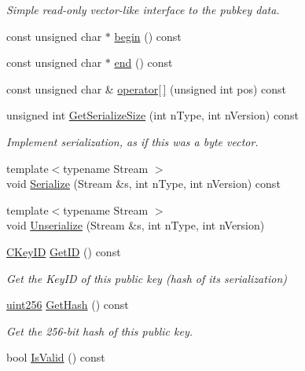 \begin{DoxyCompactItemize}
\begin{DoxyCompactList}\small\item\em Simple read-\/only vector-\/like interface to the pubkey data. \end{DoxyCompactList}\item 
const unsigned char $\ast$ \mbox{\hyperlink{class_c_pub_key_a859ab9909d68092d6d4fc739237ab358}{begin}} () const
\item 
const unsigned char $\ast$ \mbox{\hyperlink{class_c_pub_key_a1d6fb1ec2b45fb229f549215d6a23dbc}{end}} () const
\item 
const unsigned char \& \mbox{\hyperlink{class_c_pub_key_ab94321a511874f4a3cdf21f889d30144}{operator\mbox{[}$\,$\mbox{]}}} (unsigned int pos) const
\item 
unsigned int \mbox{\hyperlink{class_c_pub_key_aeb5fed8b8e3dea754e485147c1a1a8ed}{Get\+Serialize\+Size}} (int n\+Type, int n\+Version) const
\begin{DoxyCompactList}\small\item\em Implement serialization, as if this was a byte vector. \end{DoxyCompactList}\item 
{\footnotesize template$<$typename Stream $>$ }\\void \mbox{\hyperlink{class_c_pub_key_a6003c13fc0a48bae69c2a7ddb1fecc21}{Serialize}} (Stream \&s, int n\+Type, int n\+Version) const
\item 
{\footnotesize template$<$typename Stream $>$ }\\void \mbox{\hyperlink{class_c_pub_key_a1cfd8e3c711f5298eecdacd5979f6e6c}{Unserialize}} (Stream \&s, int n\+Type, int n\+Version)
\item 
\mbox{\hyperlink{class_c_key_i_d}{C\+Key\+ID}} \mbox{\hyperlink{class_c_pub_key_a2675f7e6f72eff68e7a5227289feb021}{Get\+ID}} () const
\begin{DoxyCompactList}\small\item\em Get the Key\+ID of this public key (hash of its serialization) \end{DoxyCompactList}\item 
\mbox{\hyperlink{classuint256}{uint256}} \mbox{\hyperlink{class_c_pub_key_ab1aaa3f6085a3e9bc034d3e1269d870d}{Get\+Hash}} () const
\begin{DoxyCompactList}\small\item\em Get the 256-\/bit hash of this public key. \end{DoxyCompactList}\item 
bool \mbox{\hyperlink{class_c_pub_key_a4fa94293cf8577fd039b9a133f6c7f30}{Is\+Valid}} () const

\end{DoxyCompactItemize}
